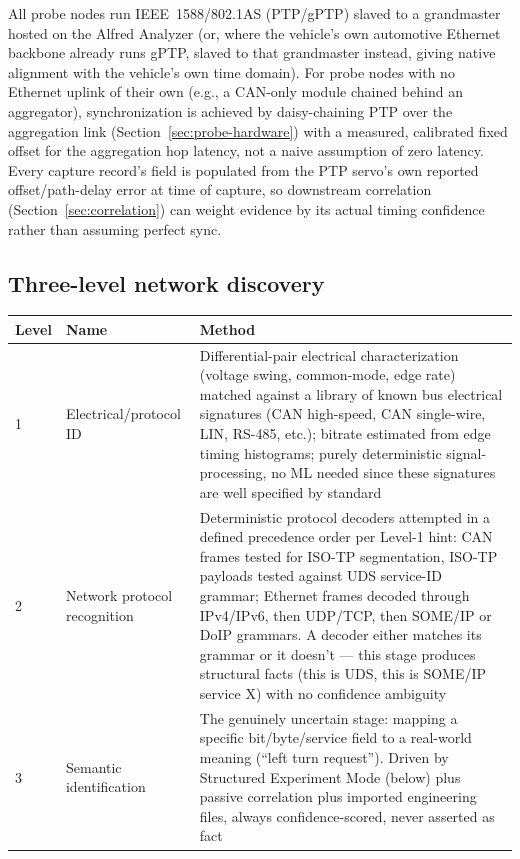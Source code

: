 \begin{decision}[title={Synchronization approach}]
All probe nodes run IEEE~1588/802.1AS (PTP/gPTP) slaved to a grandmaster hosted on the Alfred Analyzer (or, where the vehicle's own automotive Ethernet backbone already runs gPTP, slaved to that grandmaster instead, giving native alignment with the vehicle's own time domain). For probe nodes with no Ethernet uplink of their own (e.g., a CAN-only module chained behind an aggregator), synchronization is achieved by daisy-chaining PTP over the aggregation link (Section~\ref{sec:probe-hardware}) with a measured, calibrated fixed offset for the aggregation hop latency, not a naive assumption of zero latency. Every capture record's  field is populated from the PTP servo's own reported offset/path-delay error at time of capture, so downstream correlation (Section~\ref{sec:correlation}) can weight evidence by its actual timing confidence rather than assuming perfect sync.
\end{decision}

\subsection{Three-level network discovery}

\begin{center}
\small
\begin{tabularx}{\linewidth}{@{}l l X@{}}
\toprule
\textbf{Level} & \textbf{Name} & \textbf{Method} \\
\midrule
1 & Electrical/protocol ID & Differential-pair electrical characterization (voltage swing, common-mode, edge rate) matched against a library of known bus electrical signatures (CAN high-speed, CAN single-wire, LIN, RS-485, etc.); bitrate estimated from edge timing histograms; purely deterministic signal-processing, no ML needed since these signatures are well specified by standard \\
2 & Network protocol recognition & Deterministic protocol decoders attempted in a defined precedence order per Level-1 hint: CAN frames tested for ISO-TP segmentation, ISO-TP payloads tested against UDS service-ID grammar; Ethernet frames decoded through IPv4/IPv6, then UDP/TCP, then SOME/IP or DoIP grammars. A decoder either matches its grammar or it doesn't --- this stage produces structural facts (this is UDS, this is SOME/IP service X) with no confidence ambiguity \\
3 & Semantic identification & The genuinely uncertain stage: mapping a specific bit/byte/service field to a real-world meaning (``left turn request''). Driven by Structured Experiment Mode (below) plus passive correlation plus imported engineering files, always confidence-scored, never asserted as fact \\
\bottomrule
\end{tabularx}
\end{center}

